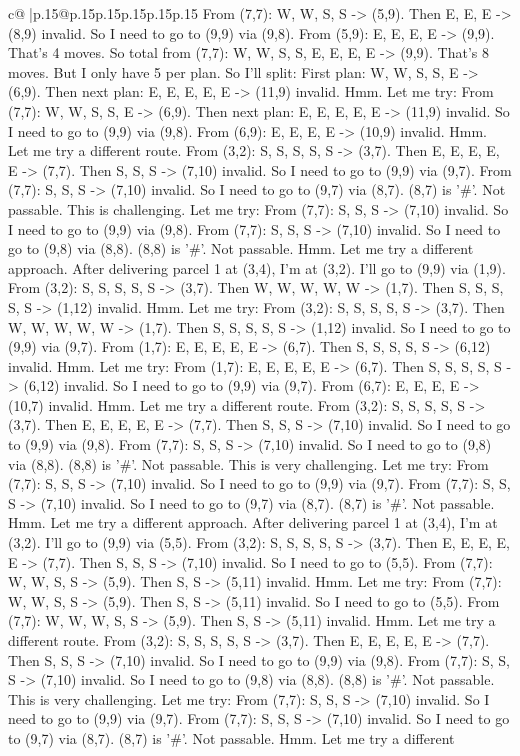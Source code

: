 \documentclass{article}
\begin{document}
{\begin{supertabular}{c@{$\;$}|p{.15\linewidth}@{}p{.15\linewidth}p{.15\linewidth}p{.15\linewidth}p{.15\linewidth}p{.15\linewidth}}
{{{From (7,7): W, W, S, S {-}> (5,9). Then E, E, E {-}> (8,9) invalid. So I need to go to (9,9) via (9,8). From (5,9): E, E, E, E {-}> (9,9). That's 4 moves. So total from (7,7): W, W, S, S, E, E, E, E {-}> (9,9). That's 8 moves. But I only have 5 per plan. So I'll split: First plan: W, W, S, S, E {-}> (6,9). Then next plan: E, E, E, E, E {-}> (11,9) invalid. Hmm. Let me try: From (7,7): W, W, S, S, E {-}> (6,9). Then next plan: E, E, E, E, E {-}> (11,9) invalid. So I need to go to (9,9) via (9,8). From (6,9): E, E, E, E {-}> (10,9) invalid. Hmm. Let me try a different route. From (3,2): S, S, S, S, S {-}> (3,7). Then E, E, E, E, E {-}> (7,7). Then S, S, S {-}> (7,10) invalid. So I need to go to (9,9) via (9,7). From (7,7): S, S, S {-}> (7,10) invalid. So I need to go to (9,7) via (8,7). (8,7) is '\#'. Not passable. This is challenging. Let me try: From (7,7): S, S, S {-}> (7,10) invalid. So I need to go to (9,9) via (9,8). From (7,7): S, S, S {-}> (7,10) invalid. So I need to go to (9,8) via (8,8). (8,8) is '\#'. Not passable. Hmm. Let me try a different approach. After delivering parcel 1 at (3,4), I'm at (3,2). I'll go to (9,9) via (1,9). From (3,2): S, S, S, S, S {-}> (3,7). Then W, W, W, W, W {-}> (1,7). Then S, S, S, S, S {-}> (1,12) invalid. Hmm. Let me try: From (3,2): S, S, S, S, S {-}> (3,7). Then W, W, W, W, W {-}> (1,7). Then S, S, S, S, S {-}> (1,12) invalid. So I need to go to (9,9) via (9,7). From (1,7): E, E, E, E, E {-}> (6,7). Then S, S, S, S, S {-}> (6,12) invalid. Hmm. Let me try: From (1,7): E, E, E, E, E {-}> (6,7). Then S, S, S, S, S {-}> (6,12) invalid. So I need to go to (9,9) via (9,7). From (6,7): E, E, E, E {-}> (10,7) invalid. Hmm. Let me try a different route. From (3,2): S, S, S, S, S {-}> (3,7). Then E, E, E, E, E {-}> (7,7). Then S, S, S {-}> (7,10) invalid. So I need to go to (9,9) via (9,8). From (7,7): S, S, S {-}> (7,10) invalid. So I need to go to (9,8) via (8,8). (8,8) is '\#'. Not passable. This is very challenging. Let me try: From (7,7): S, S, S {-}> (7,10) invalid. So I need to go to (9,9) via (9,7). From (7,7): S, S, S {-}> (7,10) invalid. So I need to go to (9,7) via (8,7). (8,7) is '\#'. Not passable. Hmm. Let me try a different approach. After delivering parcel 1 at (3,4), I'm at (3,2). I'll go to (9,9) via (5,5). From (3,2): S, S, S, S, S {-}> (3,7). Then E, E, E, E, E {-}> (7,7). Then S, S, S {-}> (7,10) invalid. So I need to go to (5,5). From (7,7): W, W, S, S {-}> (5,9). Then S, S {-}> (5,11) invalid. Hmm. Let me try: From (7,7): W, W, S, S {-}> (5,9). Then S, S {-}> (5,11) invalid. So I need to go to (5,5). From (7,7): W, W, W, S, S {-}> (5,9). Then S, S {-}> (5,11) invalid. Hmm. Let me try a different route. From (3,2): S, S, S, S, S {-}> (3,7). Then E, E, E, E, E {-}> (7,7). Then S, S, S {-}> (7,10) invalid. So I need to go to (9,9) via (9,8). From (7,7): S, S, S {-}> (7,10) invalid. So I need to go to (9,8) via (8,8). (8,8) is '\#'. Not passable. This is very challenging. Let me try: From (7,7): S, S, S {-}> (7,10) invalid. So I need to go to (9,9) via (9,7). From (7,7): S, S, S {-}> (7,10) invalid. So I need to go to (9,7) via (8,7). (8,7) is '\#'. Not passable. Hmm. Let me try a different }}}
\end{supertabular}}
\end{document}
